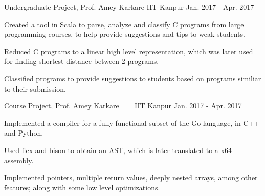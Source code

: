 


\begin{cventries}

  \cventry
  {Undergraduate Project, Prof. Amey Karkare}
  {{}
    {}}
  {IIT Kanpur}
  {Jan. 2017 - Apr. 2017}
  {
    \begin{cvitems}
    \item Created a tool in Scala to parse, analyze and classify C programs from large programming courses, to help provide suggestions and tips to weak students.
    \item Reduced C programs to a linear high level representation, which was later used for finding shortest distance between 2 programs.
    \item Classified programs to provide suggestions to students based on programs similiar to their submission.
    \end{cvitems}
    \vspace{-5mm}
  }

  \cventry
  {Course Project, Prof. Amey Karkare}
  {\href{https://github.com/pallavagarwal07/amigo.git}{}
    \ \ \ \normalfont\href{https://github.com/pallavagarwal07/amigo}
    {}}
  {IIT Kanpur}
  {Jan. 2017 - Apr. 2017}
  {
    \begin{cvitems}
    \item Implemented a compiler for a fully functional subset of the Go language, in C++ and Python.
    \item Used flex and bison to obtain an AST, which is later translated to a x64 assembly.
    \item Implemented pointers, multiple return values, deeply nested arrays, among other features; along with some low level optimizations.
    \end{cvitems}
  }


\end{cventries}
